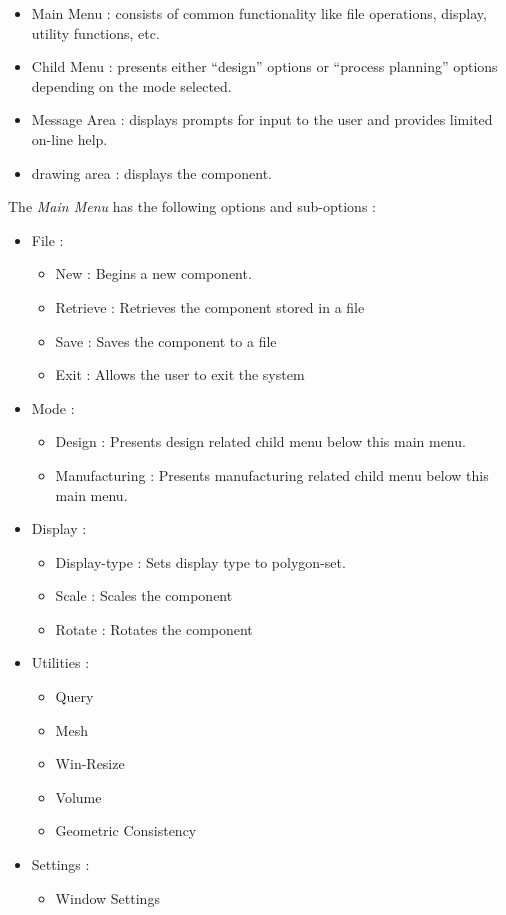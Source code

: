 		\begin{itemize}
			\item
			Main Menu : consists of common functionality like file operations,
			display, utility functions, etc.
			\item
			Child Menu : presents either ``design'' options or ``process 
			planning'' options depending on the mode selected.
			\item
			Message Area : displays prompts for input to the user and 
			provides limited on-line help.
			\item
			drawing area : displays the component.
		\end{itemize}

		The {\em Main Menu} has the following options and sub-options :
			\begin{itemize}
			\renewcommand{\thefootnote}{\fnsymbol{footnote}}
			\item
			File : 
				\begin{itemize}
					\item
					New : Begins a new component.
					\item
					Retrieve : Retrieves the component stored in a file
					\item
					Save : Saves the component to a file
					\item
					Exit : Allows the user to exit the system
				\end{itemize}
			\item
			Mode :
					\begin{itemize}
					\item
					Design : Presents design related child menu below this
					main menu.
					\item
					Manufacturing : Presents manufacturing related child menu 
					below this main menu.
					\end{itemize}
			\item
			Display	:
					\begin{itemize}
					\item
					Display-type : Sets display type to polygon-set.
					\item
					Scale 
					\footnotemark[1]  
					: Scales the component
					\item
					Rotate \footnotemark[1] : Rotates the component
					\end{itemize}
			\item
			Utilities  \footnotemark[1] : 
					\begin{itemize}
					\item
					Query
					\item
					Mesh
					\item
					Win-Resize
					\item
					Volume
					\item
					Geometric Consistency
					\end{itemize}
			\item
			Settings  \footnotemark[1] : 
					\begin{itemize}
					\item
					Window Settings
					\end{itemize}
			\end{itemize}


